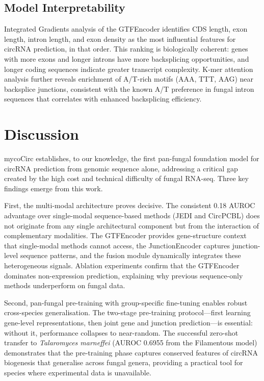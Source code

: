 \documentclass[12pt]{article}
\begin{document}
\subsection{Model Interpretability}

Integrated Gradients analysis of the GTFEncoder identifies CDS length, exon length, intron length, and exon density as the most influential features for circRNA prediction, in that order. This ranking is biologically coherent: genes with more exons and longer introns have more backsplicing opportunities, and longer coding sequences indicate greater transcript complexity. K-mer attention analysis further reveals enrichment of A/T-rich motifs (AAA, TTT, AAG) near backsplice junctions, consistent with the known A/T preference in fungal intron sequences that correlates with enhanced backsplicing efficiency.

\section{Discussion}

mycoCirc establishes, to our knowledge, the first pan-fungal foundation model for circRNA prediction from genomic sequence alone, addressing a critical gap created by the high cost and technical difficulty of fungal RNA-seq. Three key findings emerge from this work.

First, the multi-modal architecture proves decisive. The consistent 0.18 AUROC advantage over single-modal sequence-based methods (JEDI and CircPCBL) does not originate from any single architectural component but from the interaction of complementary modalities. The GTFEncoder provides gene-structure context that single-modal methods cannot access, the JunctionEncoder captures junction-level sequence patterns, and the fusion module dynamically integrates these heterogeneous signals. Ablation experiments confirm that the GTFEncoder dominates non-expression prediction, explaining why previous sequence-only methods underperform on fungal data.

Second, pan-fungal pre-training with group-specific fine-tuning enables robust cross-species generalisation. The two-stage pre-training protocol---first learning gene-level representations, then joint gene and junction prediction---is essential: without it, performance collapses to near-random. The successful zero-shot transfer to \textit{Talaromyces marneffei} (AUROC 0.6955 from the Filamentous model) demonstrates that the pre-training phase captures conserved features of circRNA biogenesis that generalise across fungal genera, providing a practical tool for species where experimental data is unavailable.
\end{document}
